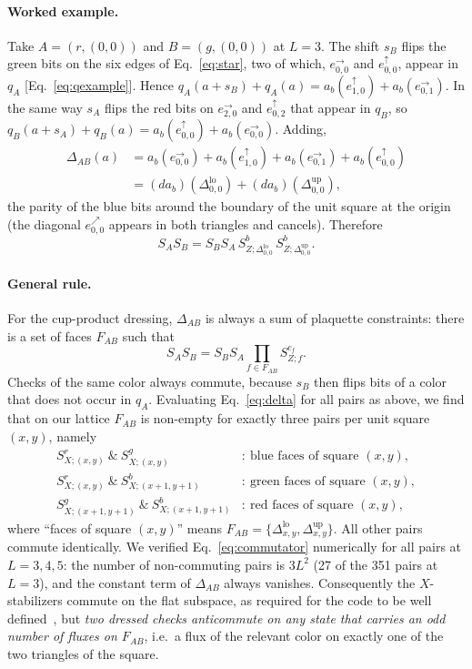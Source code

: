 \documentclass[a4paper]{article}
\newcommand{\rd}{r}
\newcommand{\gr}{g}
\newcommand{\bl}{b}
\newcommand{\eh}[1]{e^{\rightarrow}_{#1}}   %
\newcommand{\ev}[1]{e^{\uparrow}_{#1}}      %
\newcommand{\ed}[1]{e^{\nearrow}_{#1}}      %
\newcommand{\tlo}[1]{\Delta^{\mathrm{lo}}_{#1}}
\newcommand{\tup}[1]{\Delta^{\mathrm{up}}_{#1}}
\begin{document}
\paragraph{Worked example.}
Take $A=(\rd,(0,0))$ and $B=(\gr,(0,0))$ at $L=3$. The shift $s_B$ flips the green bits on the six edges of Eq.~\eqref{eq:star}, two of which, $\eh{0,0}$ and $\ev{0,0}$, appear in $q_A$ [Eq.~\eqref{eq:qexample}]. Hence $q_A(a+s_B)+q_A(a)=a_\bl(\ev{1,0})+a_\bl(\eh{0,1})$. In the same way $s_A$ flips the red bits on $\eh{2,0}$ and $\ev{0,2}$ that appear in $q_B$, so $q_B(a+s_A)+q_B(a)=a_\bl(\ev{0,0})+a_\bl(\eh{0,0})$. Adding,
\begin{align}
  \Delta_{AB}(a)&=a_\bl(\eh{0,0})+a_\bl(\ev{1,0})+a_\bl(\eh{0,1})+a_\bl(\ev{0,0})\nonumber\\
  &=(da_\bl)(\tlo{0,0})+(da_\bl)(\tup{0,0}),
  \label{eq:deltaexample}
\end{align}
the parity of the blue bits around the boundary of the unit square at the origin (the diagonal $\ed{0,0}$ appears in both triangles and cancels). Therefore
\begin{equation}
  S_AS_B=S_BS_A\,S^\bl_{Z;\tlo{0,0}}\,S^\bl_{Z;\tup{0,0}}.
\end{equation}

\paragraph{General rule.}
For the cup-product dressing, $\Delta_{AB}$ is always a sum of plaquette constraints: there is a set of faces $F_{AB}$ such that
\begin{equation}
  S_AS_B=S_BS_A\prod_{f\in F_{AB}}S^{c_f}_{Z;f}.
  \label{eq:commutator}
\end{equation}
Checks of the same color always commute, because $s_B$ then flips bits of a color that does not occur in $q_A$. Evaluating Eq.~\eqref{eq:delta} for all pairs as above, we find that on our lattice $F_{AB}$ is non-empty for exactly three pairs per unit square $(x,y)$, namely
\begin{align}
  S^\rd_{X;(x,y)}\ \&\ S^\gr_{X;(x,y)}&:\ \text{blue faces of square }(x,y),\nonumber\\
  S^\rd_{X;(x,y)}\ \&\ S^\bl_{X;(x+1,y+1)}&:\ \text{green faces of square }(x,y),\label{eq:pairs}\\
  S^\gr_{X;(x+1,y+1)}\ \&\ S^\bl_{X;(x+1,y+1)}&:\ \text{red faces of square }(x,y),\nonumber
\end{align}
where ``faces of square $(x,y)$'' means $F_{AB}=\{\tlo{x,y},\tup{x,y}\}$. All other pairs commute identically. We verified Eq.~\eqref{eq:commutator} numerically for all pairs at $L=3,4,5$: the number of non-commuting pairs is $3L^2$ (27 of the 351 pairs at $L=3$), and the constant term of $\Delta_{AB}$ always vanishes. Consequently the $X$-stabilizers commute on the flat subspace, as required for the code to be well defined~\cite{kobayashi2025clifford}, but \emph{two dressed checks anticommute on any state that carries an odd number of fluxes on $F_{AB}$}, i.e.\ a flux of the relevant color on exactly one of the two triangles of the square.
\end{document}
